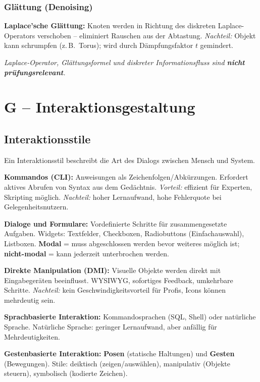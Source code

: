 \documentclass[12pt, a4paper]{article}
\begin{document}
\subsubsection*{Glättung (Denoising)}

\textbf{Laplace'sche Glättung:} Knoten werden in Richtung des diskreten Laplace-Operators verschoben -- eliminiert Rauschen aus der Abtastung. \textit{Nachteil:} Objekt kann schrumpfen (z.\,B.\ Torus); wird durch Dämpfungsfaktor $t$ gemindert.

\textit{Laplace-Operator, Glättungsformel und diskreter Informationsfluss sind \textbf{nicht prüfungsrelevant}.}

\section{G -- Interaktionsgestaltung}

\subsection{Interaktionsstile}

Ein Interaktionsstil beschreibt die Art des Dialogs zwischen Mensch und System.

\textbf{Kommandos (CLI):} Anweisungen als Zeichenfolgen/Abkürzungen. Erfordert aktives Abrufen von Syntax aus dem Gedächtnis. \textit{Vorteil:} effizient für Experten, Skripting möglich. \textit{Nachteil:} hoher Lernaufwand, hohe Fehlerquote bei Gelegenheitsnutzern.

\textbf{Dialoge und Formulare:} Vordefinierte Schritte für zusammengesetzte Aufgaben. Widgets: Textfelder, Checkboxen, Radiobuttons (Einfachauswahl), Listboxen. \textbf{Modal} = muss abgeschlossen werden bevor weiteres möglich ist; \textbf{nicht-modal} = kann jederzeit unterbrochen werden.

\textbf{Direkte Manipulation (DMI):} Visuelle Objekte werden direkt mit Eingabegeräten beeinflusst. WYSIWYG, sofortiges Feedback, umkehrbare Schritte. \textit{Nachteil:} kein Geschwindigkeitsvorteil für Profis, Icons können mehrdeutig sein.

\textbf{Sprachbasierte Interaktion:} Kommandosprachen (SQL, Shell) oder natürliche Sprache. Natürliche Sprache: geringer Lernaufwand, aber anfällig für Mehrdeutigkeiten.

\textbf{Gestenbasierte Interaktion:} \textbf{Posen} (statische Haltungen) und \textbf{Gesten} (Bewegungen). Stile: deiktisch (zeigen/auswählen), manipulativ (Objekte steuern), symbolisch (kodierte Zeichen).
\end{document}
